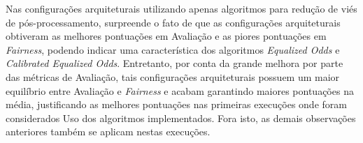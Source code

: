 \documentclass[Portugues,Final]{ic-tese-v3}
\begin{document}
Nas configurações arquiteturais utilizando apenas algoritmos para redução de viés de pós-processamento, surpreende o fato de que as configurações arquiteturais obtiveram as melhores pontuações em Avaliação e as piores pontuações em \textit{Fairness}, podendo indicar uma característica dos algoritmos \textit{Equalized Odds} e \textit{Calibrated Equalized Odds}. Entretanto, por conta da grande melhora por parte das métricas de Avaliação, tais configurações arquiteturais possuem um maior equilíbrio entre Avaliação e \textit{Fairness} e acabam garantindo maiores pontuações na média, justificando as melhores pontuações nas primeiras execuções onde foram considerados Uso dos algoritmos implementados. Fora isto, as demais observações anteriores também se aplicam nestas execuções.

\begin{table}[H]
\begin{center}
  \caption{Melhores configurações escolhidas pelo Gerenciador Autonômico \\ Sem uso de algoritmos para redução de viés - 50\% Avaliação/50\% \textit{Fairness}}
\label{tbl:ScoreMAPEKNoproc5050}
\end{center}
\end{table}
\end{document}
